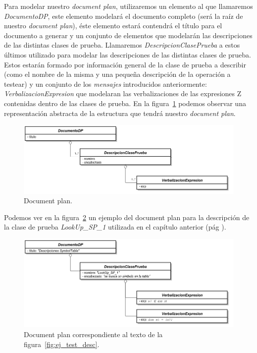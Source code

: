 Para modelar nuestro \emph{document plan}, utilizaremos un elemento al que llamaremos \emph{DocumentoDP}, este elemento modelará el documento completo (será la raíz de nuestro \emph{document plan}), éste elemento estará contendrá el título para el documento a generar y un conjunto de elementos que modelarán las descripciones de las distintas clases de prueba. Llamaremos \emph{DescripcionClasePrueba} a estos últimos utilizado para modelar las descripciones de las distintas clases de prueba. Estos estarán formado por información general de la clase de prueba a describir (como el nombre de la misma y una pequeña descripción de la operación a testear) y un conjunto de los \emph{mensajes} introducidos anteriormente: \emph{VerbalizacionExpresion} que modelaran las verbalizaciones de las expresiones Z contenidas dentro de las clases de prueba. En la figura~\ref{fig:png_document_plan} podemos observar una representación abstracta de la estructura que tendrá nuestro \emph{document plan}.

\begin{figure}[H]
  	\centering
	\includegraphics[scale=0.4]{img/document_plan.png}
	\caption{Document plan.}
  	\label{fig:png_document_plan}
\end{figure}

Podemos ver en la figura~\ref{fig:png_document_plan_ej} un ejemplo del document plan para la descripción de la clase de prueba \emph{LookUp\_SP\_1} utilizada en el capítulo anterior (pág \pageref{fig:ej_test_desc}). 

\begin{figure}[H]
  	\centering
	\includegraphics[scale=0.4]{img/document_plan_ej.png}
	\caption{Document plan correspondiente al texto de la figura~\ref{fig:ej_test_desc}.}
  	\label{fig:png_document_plan_ej}
\end{figure}

